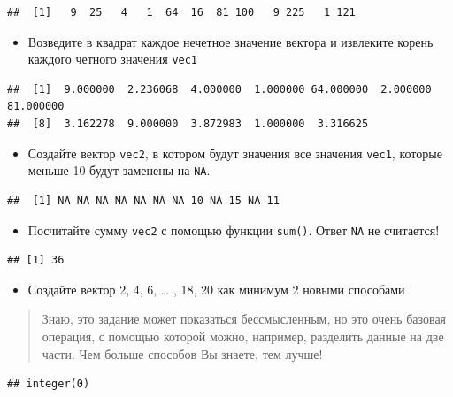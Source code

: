 \documentclass[]{book}
\providecommand{\tightlist}{%
  \setlength{\itemsep}{0pt}\setlength{\parskip}{0pt}}
\begin{document}
\begin{verbatim}
##  [1]   9  25   4   1  64  16  81 100   9 225   1 121
\end{verbatim}

\begin{itemize}
\tightlist
\item
  Возведите в квадрат каждое нечетное значение вектора и извлеките корень каждого четного значения \texttt{vec1}
\end{itemize}

\begin{verbatim}
##  [1]  9.000000  2.236068  4.000000  1.000000 64.000000  2.000000 81.000000
##  [8]  3.162278  9.000000  3.872983  1.000000  3.316625
\end{verbatim}

\begin{itemize}
\tightlist
\item
  Создайте вектор \texttt{vec2}, в котором будут значения все значения \texttt{vec1}, которые меньше 10 будут заменены на \texttt{NA}.
\end{itemize}

\begin{verbatim}
##  [1] NA NA NA NA NA NA NA 10 NA 15 NA 11
\end{verbatim}

\begin{itemize}
\tightlist
\item
  Посчитайте сумму \texttt{vec2} с помощью функции \texttt{sum()}. Ответ \texttt{NA} не считается!
\end{itemize}

\begin{verbatim}
## [1] 36
\end{verbatim}

\begin{itemize}
\tightlist
\item
  Создайте вектор 2, 4, 6, \ldots{} , 18, 20 как минимум 2 новыми способами
\end{itemize}

\begin{quote}
Знаю, это задание может показаться бессмысленным, но это очень базовая операция, с помощью которой можно, например, разделить данные на две части. Чем больше способов Вы знаете, тем лучше!
\end{quote}

\begin{verbatim}
## integer(0)
\end{verbatim}
\end{document}
